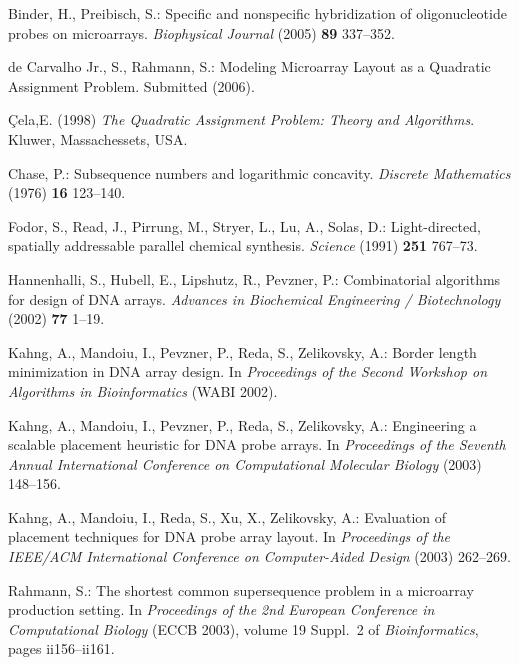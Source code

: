 \documentclass{llncs}
\newcommand{\ignore}[1]{}
\begin{document}
\begin{thebibliography}{5}

Binder, H., Preibisch, S.:
Specific and nonspecific hybridization of oligonucleotide probes on microarrays.
{\it Biophysical Journal} (2005) {\bf 89} 337--352.

de Carvalho Jr., S., Rahmann, S.:
Modeling Microarray Layout as a Quadratic Assignment Problem.
Submitted (2006).

 \c{C}ela,E. (1998) {\it The Quadratic Assignment Problem: Theory and Algorithms}. Kluwer, Massachessets, USA.


Chase, P.:
Subsequence numbers and logarithmic concavity.
{\it Discrete Mathematics} (1976) {\bf 16} 123--140.

\ignore{
\bibitem{FELDMAN93}
Feldman, W., Pevzner, P.:
Gray code masks for sequencing by hibridization.
{\it Genomics} (1994) {\bf 23} 233--235.
}

Fodor, S., Read, J., Pirrung, M., Stryer, L., Lu, A., Solas, D.:
Light-directed, spatially addressable parallel chemical synthesis.
{\it Science} (1991) {\bf 251} 767--73.

Hannenhalli, S., Hubell, E., Lipshutz, R., Pevzner, P.:
Combinatorial algorithms for design of DNA arrays.
{\it Advances in Biochemical Engineering / Biotechnology} (2002) {\bf 77} 1--19.

Kahng, A., Mandoiu, I., Pevzner, P., Reda, S., Zelikovsky, A.:
Border length minimization in DNA array design.
In {\it Proceedings of the Second Workshop on Algorithms in Bioinformatics} (WABI 2002).

Kahng, A., Mandoiu, I., Pevzner, P., Reda, S., Zelikovsky, A.:
Engineering a scalable placement heuristic for DNA probe arrays.
In {\it Proceedings of the Seventh Annual International Conference on Computational
Molecular Biology} (2003) 148--156.

Kahng, A., Mandoiu, I., Reda, S., Xu, X., Zelikovsky, A.:
Evaluation of placement techniques for DNA probe array layout.
In {\it Proceedings of the IEEE/ACM International Conference on Computer-Aided Design}
(2003) 262--269.

Rahmann, S.:
The shortest common supersequence problem in a microarray production setting.
In {\it Proceedings of the 2nd European Conference in Computational Biology}
({ECCB} 2003), volume 19 Suppl.~2 of {\it Bioinformatics}, pages ii156--ii161.

\end{thebibliography}
\end{document}
